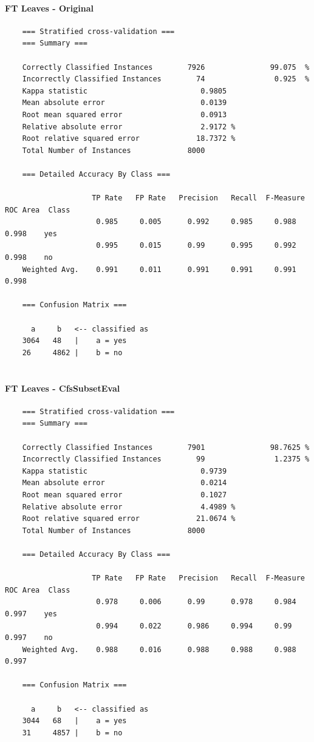 \paragraph{FT Leaves - Original}
{\footnotesize
	\begin{verbatim}
	=== Stratified cross-validation ===
	=== Summary ===
	
	Correctly Classified Instances        7926               99.075  %
	Incorrectly Classified Instances        74                0.925  %
	Kappa statistic                          0.9805
	Mean absolute error                      0.0139
	Root mean squared error                  0.0913
	Relative absolute error                  2.9172 %
	Root relative squared error             18.7372 %
	Total Number of Instances             8000     
	
	=== Detailed Accuracy By Class ===
	
	                TP Rate   FP Rate   Precision   Recall  F-Measure   ROC Area  Class
	                 0.985     0.005      0.992     0.985     0.988      0.998    yes
	                 0.995     0.015      0.99      0.995     0.992      0.998    no
	Weighted Avg.    0.991     0.011      0.991     0.991     0.991      0.998
	
	=== Confusion Matrix ===
	
	  a     b   <-- classified as
	3064   48   |    a = yes
	26     4862 |    b = no
	
	\end{verbatim}
}
\paragraph{FT Leaves - CfsSubsetEval}
{\footnotesize
	\begin{verbatim}
	=== Stratified cross-validation ===
	=== Summary ===
	
	Correctly Classified Instances        7901               98.7625 %
	Incorrectly Classified Instances        99                1.2375 %
	Kappa statistic                          0.9739
	Mean absolute error                      0.0214
	Root mean squared error                  0.1027
	Relative absolute error                  4.4989 %
	Root relative squared error             21.0674 %
	Total Number of Instances             8000     
	
	=== Detailed Accuracy By Class ===
	
	                TP Rate   FP Rate   Precision   Recall  F-Measure   ROC Area  Class
	                 0.978     0.006      0.99      0.978     0.984      0.997    yes
	                 0.994     0.022      0.986     0.994     0.99       0.997    no
	Weighted Avg.    0.988     0.016      0.988     0.988     0.988      0.997
	
	=== Confusion Matrix ===
	
	  a     b   <-- classified as
	3044   68   |    a = yes
	31     4857 |    b = no
	
	\end{verbatim}
}

